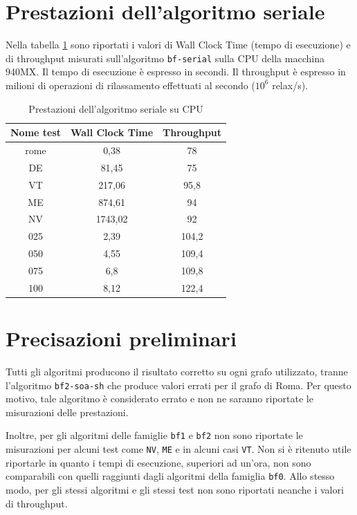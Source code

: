 \documentclass[12pt,a4paper]{book} %
\begin{document}
	\section{Prestazioni dell'algoritmo seriale}
	Nella tabella \ref{tab:performance_serial} sono riportati i valori di Wall Clock Time (tempo di esecuzione) e di throughput misurati sull'algoritmo \texttt{bf-serial} sulla CPU della macchina 940MX. Il tempo di esecuzione è espresso in secondi. Il throughput è espresso in milioni di operazioni di rilassamento effettuati al secondo ($10^6$ relax/s).
	
	\begin{table}[!ht]
		\centering
		\begin{tabular}{|c|c|c|}
			\hline
			\textbf{Nome test} & \textbf{Wall Clock Time} & \textbf{Throughput} \\ \hline
			       rome & 0,38 & 78 \\ \hline
			        DE & 81,45 & 75 \\ \hline
			        VT & 217,06 & 95,8 \\ \hline
			        ME & 874,61 & 94 \\ \hline
			        NV & 1743,02 & 92 \\ \hline
			        025 & 2,39 & 104,2 \\ \hline
			        050 & 4,55 & 109,4 \\ \hline
			        075 & 6,8 & 109,8 \\ \hline
			        100 & 8,12 & 122,4 \\ \hline
		\end{tabular}
		\caption{Prestazioni dell'algoritmo seriale su CPU}
		\label{tab:performance_serial}
	\end{table}

	\section{Precisazioni preliminari}
	Tutti gli algoritmi producono il risultato corretto su ogni grafo utilizzato, tranne l'algoritmo \texttt{bf2-soa-sh} che produce valori errati per il grafo di Roma. Per questo motivo, tale algoritmo è considerato errato e non ne saranno riportate le misurazioni delle prestazioni.
	
	Inoltre, per gli algoritmi delle famiglie \texttt{bf1} e \texttt{bf2} non sono riportate le misurazioni per alcuni test come \texttt{NV}, \texttt{ME} e in alcuni casi \texttt{VT}. Non si è ritenuto utile riportarle in quanto i tempi di esecuzione, superiori ad un'ora, non sono comparabili con quelli raggiunti dagli algoritmi della famiglia \texttt{bf0}. Allo stesso modo, per gli stessi algoritmi e gli stessi test non sono riportati neanche i valori di throughput.
	
\end{document}
